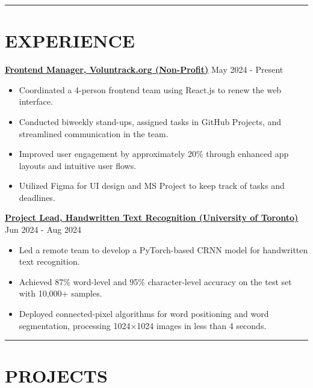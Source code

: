 \documentclass[a4paper,10pt]{article}
\begin{document}
\noindent\rule{\linewidth}{1pt}

\section*{\textbf{EXPERIENCE}}

\noindent\href{https://github.com/VolunTrack/Web}{\uline{
\textbf{Frontend Manager, Voluntrack.org (Non-Profit)}}} \hfill May 2024 - Present
\begin{itemize}[leftmargin=0.2in]
    \item Coordinated a 4-person frontend team using React.js to renew the web interface.
    \item Conducted biweekly stand-ups, assigned tasks in GitHub Projects, and streamlined communication in the team.
    \item Improved user engagement by approximately 20\% through enhanced app layouts and intuitive user flows.
    \item Utilized Figma for UI design and MS Project to keep track of tasks and deadlines.
\end{itemize}

\vspace{0.3cm}
\noindent\href{https://github.com/Ken-2511/HandwritingRecognition}{\uline{
\textbf{Project Lead, Handwritten Text Recognition (University of Toronto)}}} \hfill Jun 2024 - Aug 2024
\begin{itemize}[leftmargin=0.2in]
    \item Led a remote team to develop a PyTorch-based CRNN model for handwritten text recognition.
    \item Achieved 87\% word-level and 95\% character-level accuracy on the test set with 10,000+ samples.
    \item Deployed connected-pixel algorithms for word positioning and word segmentation, processing 1024$\times$1024 images in less than 4 seconds.
\end{itemize}

\noindent\rule{\linewidth}{1pt}

\section*{\textbf{PROJECTS}}
\end{document}
